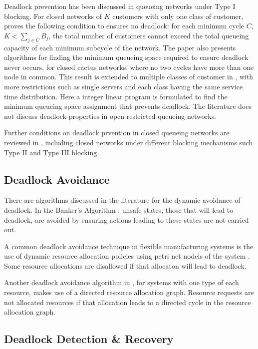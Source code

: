 \documentclass{article}
\begin{document}
Deadlock prevention has been discussed in queueing networks under Type I blocking.
For closed networks of $K$ customers with only one class of customer, \cite{kunduakyildiz89} proves the following condition to ensures no deadlock: for each minimum cycle $C$, $K < \sum_{j\in C} B_j$, the total number of customers cannot exceed the total queueing capacity of each minimum subcycle of the network.
The paper also presents algorithms for finding the minimum queueing space required to ensure deadlock never occurs, for closed cactus networks, where no two cycles have more than one node in common.
This result is extended to multiple classes of customer in \cite{liebeherrakyildiz95}, with more restrictions such as single servers and each class having the same service time distribution.
Here a integer linear program is formulated to find the minimum queueing space assignment that prevents deadlock.
The literature does not discuss deadlock properties in open restricted queueing networks.

Further conditions on deadlock prvention in closed queueing networks are reviewed in \cite{onvural90}, including closed networks under different blocking mechanisms such Type II and Type III blocking.

\subsection{Deadlock Avoidance}

There are algorithms discussed in the literature for the dynamic avoidance of deadlock.
In the Banker's Algorithm \cite{dijkstra82, kawadkaretal14}, unsafe states, those that will lead to deadlock, are avoided by ensuring actions leading to these states are not carried out.

A common deadlock avoidance technique in flexible manufacturing systems is the use of dynamic resource allocation policies using petri net nodels of the system \cite{viswanadhametal90, ezpeletaetal02}.
Some resource allocations are disallowed if that allocaton will lead to deadlock.

Another deadlock avoidance algorithm in \cite{belik90}, for systems with one type of each resource, makes use of a directed resource allocation graph. Resource requests are not allocated resources if that allocation leads to a directed cycle in the resource allocation graph.

\subsection{Deadlock Detection \& Recovery}
\end{document}
